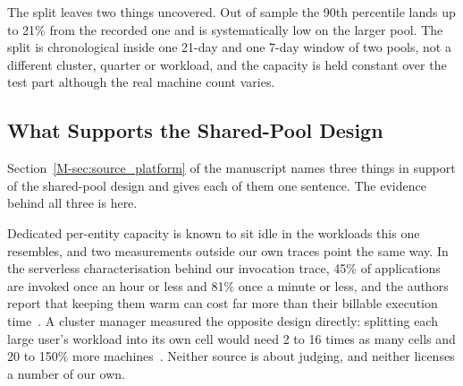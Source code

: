 \documentclass[mathematics,supfile,submit,moreauthors]{Definitions/mdpi}
\newcommand{\devnum}[1]{#1}
\begin{document}
The split leaves two things uncovered. Out of sample the 90th percentile lands up to \devnum{21\%} from the recorded
one and is systematically low on the larger pool. The split is chronological inside one
\devnum{21}-day and one \devnum{7}-day window of two pools, not a different cluster,
quarter or workload, and the capacity is held constant over the test part although the
real machine count varies.


\subsection{What Supports the Shared-Pool Design}
\label{sec:supp_pool}

Section~\ref*{M-sec:source_platform} of the manuscript names three things in support of the shared-pool design
and gives each of them one sentence. The evidence behind all three is here.

Dedicated per-entity capacity is known to sit idle in the workloads this one resembles,
and two measurements outside our own traces point the same way. In the serverless
characterisation behind our invocation trace, \devnum{45\%} of applications are invoked
once an hour or less and \devnum{81\%} once a minute or less, and the authors report
that keeping them warm can cost far more than their billable execution
time~\cite{shahrad2020wild}. A cluster manager measured the opposite design directly:
splitting each large user's workload into its own cell would need \devnum{2} to
\devnum{16} times as many cells and \devnum{20} to \devnum{150\%} more
machines~\cite{verma2015borg}. Neither source is about judging, and neither licenses a
number of our own.
\end{document}
